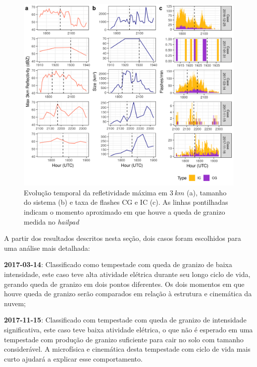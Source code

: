 \begin{figure}[hp]
	\begin{center}
		\caption{Evolução temporal da refletividade máxima em $3\:km$ (a), tamanho do sistema (b) e taxa de flashes CG e IC (c). As linhas pontilhadas indicam o momento aproximado em que houve a queda de granizo medida no \textit{hailpad}} 
		\label{painel_ciclo}
		\includegraphics[width=0.99\columnwidth]{../General_Processing/figures/cases_dbz_size_lightning.png}
	\end{center}
\end{figure}



A partir dos resultados descritos nesta seção, dois casos foram escolhidos para uma análise mais detalhada:

\begin{alineas}
	\item \textbf{2017-03-14}: Classificado como tempestade com queda de granizo de baixa intensidade, este caso teve alta atividade elétrica durante seu longo ciclo de vida, gerando queda de granizo em dois pontos diferentes. Os dois momentos em que houve queda de granizo serão comparados em relação à estrutura e cinemática da nuvem;
	\item \textbf{2017-11-15}: Classificado com tempestade com queda de granizo de intensidade significativa, este caso teve baixa atividade elétrica, o que não é esperado em uma tempestade com produção de granizo suficiente para cair no solo com tamanho considerável. A microfísica e cinemática desta tempestade com ciclo de vida mais curto ajudará a explicar esse comportamento.
\end{alineas}


